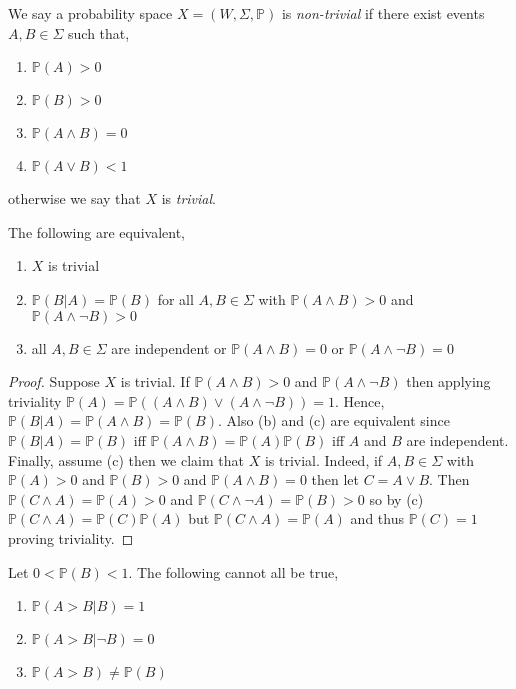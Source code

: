 \documentclass[12pt]{article}
\renewcommand{\P}{\mathbb{P}}
\begin{document}
\begin{defn}
We say a probability space $X = (W, \Sigma, \P)$ is \textit{non-trivial} if there exist events $A, B \in \Sigma$ such that,
\begin{enumerate}
\item $\P(A) > 0$
\item $\P(B) > 0$
\item $\P(A \wedge B) = 0$
\item $\P(A \vee B) < 1$
\end{enumerate}
otherwise we say that $X$ is \textit{trivial}.
\end{defn}

\begin{lemma}
The following are equivalent,
\begin{enumerate}
\item $X$ is trivial
\item $\P(B | A) = \P(B)$ for all $A, B \in \Sigma$ with $\P(A \wedge B) > 0$ and $\P(A \wedge \neg B) > 0$
\item all $A, B \in \Sigma$ are independent or $\P(A \wedge B) = 0$ or $\P(A \wedge \neg B) = 0$
\end{enumerate}
\end{lemma}

\begin{proof}
Suppose $X$ is trivial. If $\P(A \wedge B) > 0$ and $\P(A \wedge \neg B)$ then applying triviality $\P(A) = \P((A \wedge B) \vee (A \wedge \neg B)) = 1$. Hence, $\P(B|A) = \P(A \wedge B) = \P(B)$. Also (b) and (c) are equivalent since $\P(B|A) = \P(B)$ iff $\P(A \wedge B) = \P(A) \P(B)$ iff $A$ and $B$ are independent. Finally, assume (c) then we claim that $X$ is trivial. Indeed, if $A, B \in \Sigma$ with $\P(A) > 0$ and $\P(B) > 0$ and $\P(A \wedge B) = 0$ then let $C = A \vee B$. Then $\P(C \wedge A) = \P(A) > 0$ and $\P(C \wedge \neg A) = \P(B) > 0$ so by (c) $\P(C \wedge A) = \P(C) \P(A)$ but $\P(C \wedge A) = \P(A)$ and thus $\P(C) = 1$ proving triviality. 
\end{proof}

\begin{lemma}[Lewis]
Let $0 < \P(B) < 1$. The following cannot all be true,
\begin{enumerate}
\item $\P(A > B | B) = 1$
\item $\P(A > B | \neg B) = 0$
\item $\P(A > B) \neq \P(B)$
\end{enumerate}
\end{lemma}
\end{document}
